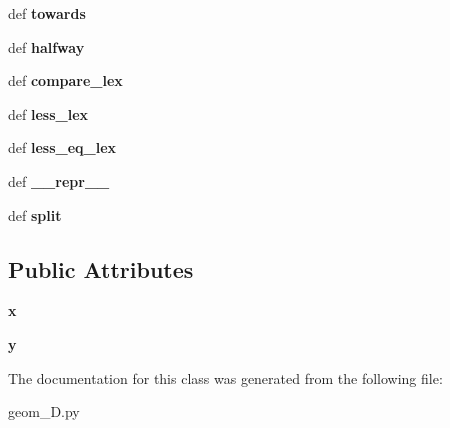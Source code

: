 \begin{DoxyCompactItemize}
\item 
\hypertarget{classgeom__2D_1_1Point_a950fadad6015d1cb6db721157417c009}{def {\bfseries towards}}\label{classgeom__2D_1_1Point_a950fadad6015d1cb6db721157417c009}

\item 
\hypertarget{classgeom__2D_1_1Point_a601b9635379ad56399199a9759346000}{def {\bfseries halfway}}\label{classgeom__2D_1_1Point_a601b9635379ad56399199a9759346000}

\item 
\hypertarget{classgeom__2D_1_1Point_a4ed19cb5b2f4d7c97954664c92d6be9c}{def {\bfseries compare\-\_\-lex}}\label{classgeom__2D_1_1Point_a4ed19cb5b2f4d7c97954664c92d6be9c}

\item 
\hypertarget{classgeom__2D_1_1Point_af9d4f1e7b789a159f06caa6928d5bcab}{def {\bfseries less\-\_\-lex}}\label{classgeom__2D_1_1Point_af9d4f1e7b789a159f06caa6928d5bcab}

\item 
\hypertarget{classgeom__2D_1_1Point_a12324486bab963747f034f3291a09c8a}{def {\bfseries less\-\_\-eq\-\_\-lex}}\label{classgeom__2D_1_1Point_a12324486bab963747f034f3291a09c8a}

\item 
\hypertarget{classgeom__2D_1_1Point_abdf20d95265493e609ba4c16bc2e6600}{def {\bfseries \-\_\-\-\_\-repr\-\_\-\-\_\-}}\label{classgeom__2D_1_1Point_abdf20d95265493e609ba4c16bc2e6600}

\item 
\hypertarget{classgeom__2D_1_1Point_ac318fae0a1795cd41563a3aa5953a963}{def {\bfseries split}}\label{classgeom__2D_1_1Point_ac318fae0a1795cd41563a3aa5953a963}

\end{DoxyCompactItemize}
\subsection*{\-Public \-Attributes}
\begin{DoxyCompactItemize}
\item 
\hypertarget{classgeom__2D_1_1Point_aefa9dfc327283d0c09957f2148eac450}{{\bfseries x}}\label{classgeom__2D_1_1Point_aefa9dfc327283d0c09957f2148eac450}

\item 
\hypertarget{classgeom__2D_1_1Point_a0c1f28f057f63453d4580f2baaa77b57}{{\bfseries y}}\label{classgeom__2D_1_1Point_a0c1f28f057f63453d4580f2baaa77b57}

\end{DoxyCompactItemize}


\-The documentation for this class was generated from the following file\-:\begin{DoxyCompactItemize}
\item 
geom\-\_\-D.\-py\end{DoxyCompactItemize}

